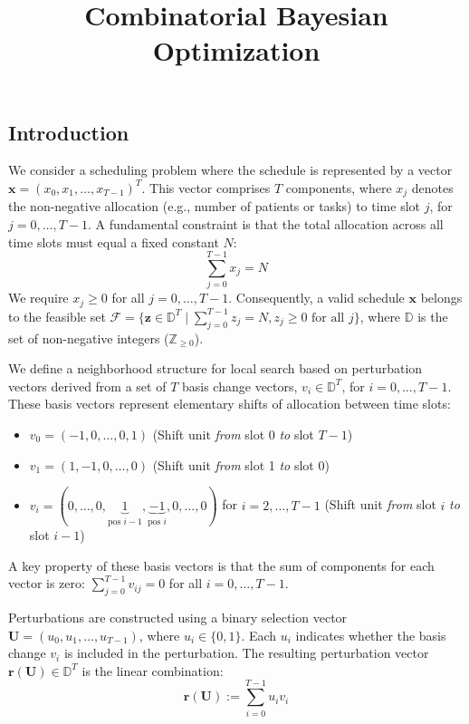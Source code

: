 \documentclass[
  letterpaper,
  DIV=11,
  numbers=noendperiod]{scrartcl}
\title{Combinatorial Bayesian Optimization}
\author{}
\date{}
\renewcommand*\contentsname{Table of contents}
\newcommand\contentsname{Table of contents}
\begin{document}
\maketitle

\renewcommand*\contentsname{Table of contents}
{
\hypersetup{linkcolor=}
\setcounter{tocdepth}{3}
\tableofcontents
}
\subsection{Introduction}\label{introduction}

We consider a scheduling problem where the schedule is represented by a
vector \(\mathbf{x} = (x_0, x_1, \ldots, x_{T-1})^T\). This vector
comprises \(T\) components, where \(x_j\) denotes the non-negative
allocation (e.g., number of patients or tasks) to time slot \(j\), for
\(j = 0, \ldots, T-1\). A fundamental constraint is that the total
allocation across all time slots must equal a fixed constant \(N\):
\[ \sum_{j=0}^{T-1} x_j = N \] We require \(x_j \ge 0\) for all
\(j = 0, \ldots, T-1\). Consequently, a valid schedule \(\mathbf{x}\)
belongs to the feasible set
\(\mathcal{F} = \{ \mathbf{z} \in \mathbb{D}^{T} \mid \sum_{j=0}^{T-1} z_j = N, z_j \ge 0 \text{ for all } j\}\),
where \(\mathbb{D}\) is the set of non-negative integers
(\(\mathbb{Z}_{\ge 0}\)).

We define a neighborhood structure for local search based on
perturbation vectors derived from a set of \(T\) basis change vectors,
\(v_i \in \mathbb{D}^{T}\), for \(i = 0, \ldots, T-1\). These basis
vectors represent elementary shifts of allocation between time slots:

\begin{itemize}
\item
  \(v_0 = (-1, 0, \ldots, 0, 1)\) (Shift unit \emph{from} slot 0
  \emph{to} slot \(T-1\))
\item
  \(v_1 = (1, -1, 0, \ldots, 0)\) (Shift unit \emph{from} slot 1
  \emph{to} slot 0)
\item
  \(v_i = (0, \ldots, 0, \underbrace{1}_{\text{pos } i-1}, \underbrace{-1}_{\text{pos } i}, 0, \ldots, 0)\)
  for \(i = 2, \ldots, T-1\) (Shift unit \emph{from} slot \(i\)
  \emph{to} slot \(i-1\))
\end{itemize}

A key property of these basis vectors is that the sum of components for
each vector is zero: \(\sum_{j=0}^{T-1} v_{ij} = 0\) for all
\(i=0, \ldots, T-1\).

Perturbations are constructed using a binary selection vector
\(\mathbf{U} = (u_0, u_1, \ldots, u_{T-1})\), where
\(u_i \in \{0, 1\}\). Each \(u_i\) indicates whether the basis change
\(v_i\) is included in the perturbation. The resulting perturbation
vector \(\mathbf{r}(\mathbf{U}) \in \mathbb{D}^{T}\) is the linear
combination: \[ \mathbf{r}(\mathbf{U}) := \sum_{i=0}^{T-1} u_i v_i \]
\end{document}
